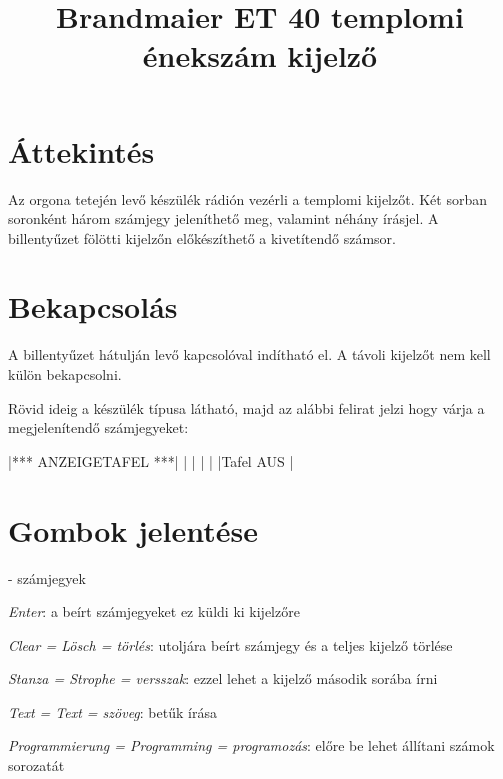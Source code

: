 \documentclass{article}
\begin{document}

\title{Brandmaier ET 40 templomi énekszám kijelző}
\date{}

\setlength{\droptitle}{-3cm}
\maketitle

\section*{Áttekintés}

Az orgona tetején levő készülék rádión vezérli a templomi kijelzőt. Két sorban soronként három számjegy jeleníthető meg, valamint néhány írásjel. A billentyűzet fölötti kijelzőn előkészíthető a kivetítendő számsor.

\section*{Bekapcsolás}

A billentyűzet hátulján levő kapcsolóval indítható el. A távoli kijelzőt nem kell külön bekapcsolni.



Rövid ideig a készülék típusa látható, majd az alábbi felirat jelzi hogy várja a megjelenítendő számjegyeket:

\setlength\LCDunitlength{0.3mm}
|*** ANZEIGETAFEL ***|
|                    |
|                    |
|Tafel AUS           |
\setlength\LCDunitlength{0.6mm}

\section*{Gombok jelentése}

- számjegyek

\keys{ } \emph{Enter}: a beírt számjegyeket ez küldi ki kijelzőre

 \emph{Clear = Lösch = törlés}: utoljára beírt számjegy és a teljes kijelző törlése

 \emph{Stanza = Strophe = versszak}: ezzel lehet a kijelző második sorába írni

 \emph{Text = Text = szöveg}: betűk írása

 \emph{Programmierung = Programming = programozás}: előre be lehet állítani számok sorozatát
\end{document}
